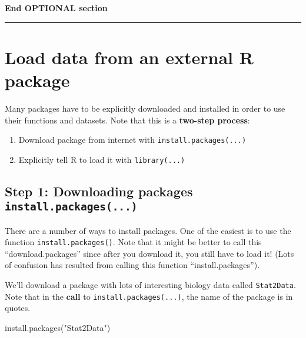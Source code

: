 \documentclass[
]{book}
\newenvironment{Shaded}{\begin{snugshade}}{\end{snugshade}}
\newcommand{\FunctionTok}[1]{\textcolor[rgb]{0.00,0.00,0.00}{#1}}
\newcommand{\NormalTok}[1]{#1}
\newcommand{\StringTok}[1]{\textcolor[rgb]{0.31,0.60,0.02}{#1}}
\providecommand{\tightlist}{%
  \setlength{\itemsep}{0pt}\setlength{\parskip}{0pt}}
\begin{document}
\textbf{End OPTIONAL section}

\begin{center}\rule{0.5\linewidth}{0.5pt}\end{center}

\hypertarget{load-data-from-an-external-r-package}{%
\section{Load data from an external R package}\label{load-data-from-an-external-r-package}}

Many packages have to be explicitly downloaded and installed in order to use their functions and datasets. Note that this is a \textbf{two-step process}:

\begin{enumerate}
\def\labelenumi{\arabic{enumi}.}
\tightlist
\item
  Download package from internet with \texttt{install.packages(...)}
\item
  Explicitly tell R to load it with \texttt{library(...)}
\end{enumerate}

\hypertarget{step-1-downloading-packages-install.packages...}{%
\subsection{\texorpdfstring{Step 1: Downloading packages \texttt{install.packages(...)}}{Step 1: Downloading packages install.packages(...)}}\label{step-1-downloading-packages-install.packages...}}

There are a number of ways to install packages. One of the easiest is to use the function \texttt{install.packages()}. Note that it might be better to call this ``download.packages'' since after you download it, you still have to load it! (Lots of confusion has resulted from calling this function ``install.packages'').

We'll download a package with lots of interesting biology data called \texttt{Stat2Data}. Note that in the \textbf{call} to \texttt{install.packages(...)}, the name of the package is in quotes.

\begin{Shaded}
\begin{Highlighting}[]
\FunctionTok{install.packages}\NormalTok{(}\StringTok{"Stat2Data"}\NormalTok{)}
\end{Highlighting}
\end{Shaded}
\end{document}
